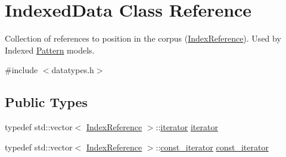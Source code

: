 \hypertarget{classIndexedData}{}\section{Indexed\+Data Class Reference}
\label{classIndexedData}


Collection of references to position in the corpus (\hyperlink{classIndexReference}{Index\+Reference}). Used by Indexed \hyperlink{classPattern}{Pattern} models.  




{\ttfamily \#include $<$datatypes.\+h$>$}

\subsection*{Public Types}
\begin{DoxyCompactItemize}
\item 
typedef std\+::vector$<$ \hyperlink{classIndexReference}{Index\+Reference} $>$\+::\hyperlink{classIndexedData_a92375fc0f92911f92908da2251d70fde}{iterator} \hyperlink{classIndexedData_a92375fc0f92911f92908da2251d70fde}{iterator}
\item 
typedef std\+::vector$<$ \hyperlink{classIndexReference}{Index\+Reference} $>$\+::\hyperlink{classIndexedData_a8fb4f6765def0ce366381f0b0aa5c04a}{const\+\_\+iterator} \hyperlink{classIndexedData_a8fb4f6765def0ce366381f0b0aa5c04a}{const\+\_\+iterator}
\end{DoxyCompactItemize}

